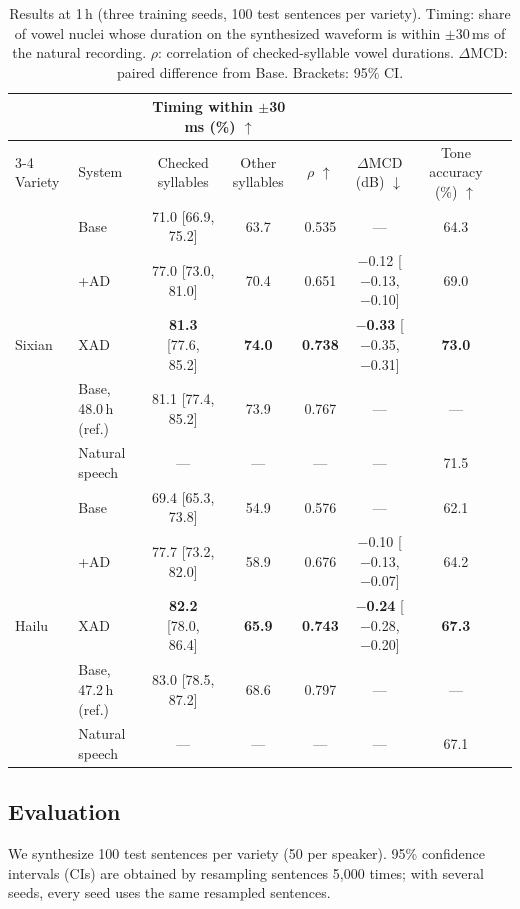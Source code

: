 \documentclass[conference,a4paper]{IEEEtran}
\begin{document}
\begin{table}[t]
\centering
\caption{Results at 1\,h (three training seeds, 100 test sentences per variety). Timing: share of vowel nuclei whose duration on the synthesized waveform is within $\pm$30\,ms of the natural recording. $\rho$: correlation of checked-syllable vowel durations. $\Delta$MCD: paired difference from Base. Brackets: 95\% CI.}
\label{tab:main}
\footnotesize
\begin{tabular}{llcccccc}
\toprule
 & & \multicolumn{2}{c}{Timing within $\pm$30\,ms (\%) $\uparrow$} & & & & \\
\cmidrule(lr){3-4}
Variety & System & Checked syllables & Other syllables & $\rho$ $\uparrow$ & $\Delta$MCD (dB) $\downarrow$ & Tone accuracy (\%) $\uparrow$ \\
\midrule
\multirow{5}{*}{Sixian}
 & Base               & 71.0 [66.9, 75.2] & 63.7 & 0.535 & ---                        & 64.3 \\
 & +AD                & 77.0 [73.0, 81.0] & 70.4 & 0.651 & $-$0.12 [$-$0.13, $-$0.10] & 69.0 \\
 & XAD                & \textbf{81.3} [77.6, 85.2] & \textbf{74.0} & \textbf{0.738} & \textbf{$-$0.33} [$-$0.35, $-$0.31] & \textbf{73.0} \\
\cmidrule(lr){2-7}
 & Base, 48.0\,h (ref.) & 81.1 [77.4, 85.2] & 73.9 & 0.767 & --- & --- \\
 & Natural speech     & --- & --- & --- & --- & 71.5 \\
\midrule
\multirow{5}{*}{Hailu}
 & Base               & 69.4 [65.3, 73.8] & 54.9 & 0.576 & ---                        & 62.1 \\
 & +AD                & 77.7 [73.2, 82.0] & 58.9 & 0.676 & $-$0.10 [$-$0.13, $-$0.07] & 64.2 \\
 & XAD                & \textbf{82.2} [78.0, 86.4] & \textbf{65.9} & \textbf{0.743} & \textbf{$-$0.24} [$-$0.28, $-$0.20] & \textbf{67.3} \\
\cmidrule(lr){2-7}
 & Base, 47.2\,h (ref.) & 83.0 [78.5, 87.2] & 68.6 & 0.797 & --- & --- \\
 & Natural speech     & --- & --- & --- & --- & 67.1 \\
\bottomrule
\end{tabular}
\end{table}

\subsection{Evaluation}
We synthesize 100 test sentences per variety (50 per speaker). 95\% confidence intervals (CIs) are obtained by resampling sentences 5{,}000 times; with several seeds, every seed uses the same resampled sentences.
\end{document}
